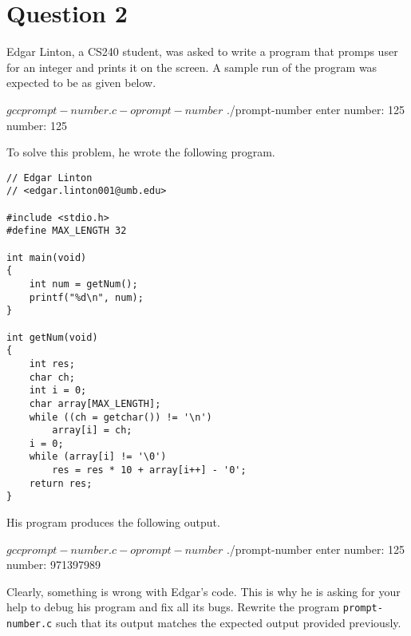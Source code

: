 
\section*{Question 2}

Edgar Linton, a CS240 student, was asked to write a program that promps user for an integer and prints it on the screen.
A sample run of the program was expected to be as given below.

\begin{terminal}
$ gcc prompt-number.c -o prompt-number
$ ./prompt-number
enter number: 125
number: 125
\end{terminal}

To solve this problem, he wrote the following program.

\lstset{language=c,tabsize=4}
\begin{lstlisting}
// Edgar Linton
// <edgar.linton001@umb.edu>

#include <stdio.h>
#define MAX_LENGTH 32

int main(void)
{
	int num = getNum();
	printf("%d\n", num);
}

int getNum(void)
{
	int res;
	char ch;
	int i = 0;
	char array[MAX_LENGTH];
	while ((ch = getchar()) != '\n')
		array[i] = ch;
	i = 0;
	while (array[i] != '\0')
		res = res * 10 + array[i++] - '0';
	return res;
}
\end{lstlisting}

His program produces the following output.

\begin{terminal}
$ gcc prompt-number.c -o prompt-number
$ ./prompt-number
enter number: 125
number: 971397989
\end{terminal}

Clearly, something is wrong with Edgar's code.
This is why he is asking for your help to debug his program and fix all its bugs.
Rewrite the program \texttt{prompt-number.c} such that its output matches the expected output provided previously.
